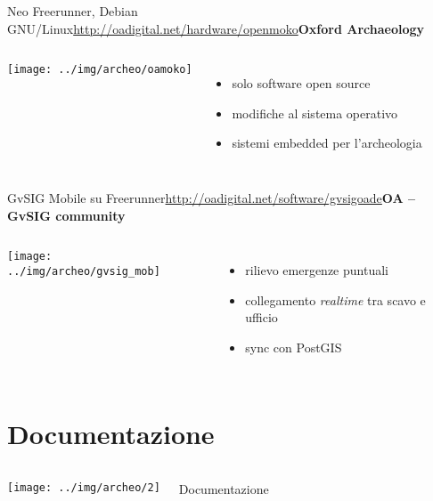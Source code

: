 \documentclass[xcolor=svgnames]{beamer}
\begin{document}
		\begin{frame}{Neo Freerunner, Debian GNU/Linux}{\url{http://oadigital.net/hardware/openmoko}\hfill \small{\textbf{Oxford Archaeology}}}
			\begin{columns}[c]
					\begin{center}
						\texttt{[image: ../img/archeo/oamoko]}
					\end{center}
					\begin{itemize}
						\item solo software open source
						\item modifiche al sistema operativo
						\item sistemi embedded per l'archeologia
					\end{itemize}
			\end{columns}
		\end{frame}


		\begin{frame}{GvSIG Mobile su Freerunner}{\url{http://oadigital.net/software/gvsigoade}\hfill \small{\textbf{OA -- GvSIG community}}}
			\begin{columns}[c]
					\begin{center}
						\texttt{[image: ../img/archeo/gvsig\_mob]}
					\end{center}
					\begin{itemize}
						\item rilievo emergenze puntuali
						\item collegamento \textit{realtime} tra scavo e ufficio
						\item sync con PostGIS
					\end{itemize}
			\end{columns}
		\end{frame}

	\section{Documentazione}

		\begin{frame}
			\begin{columns}[c]
					\begin{center}
						\texttt{[image: ../img/archeo/2]}
					\end{center}
					\Huge Documentazione
			\end{columns}
		\end{frame}
\end{document}

